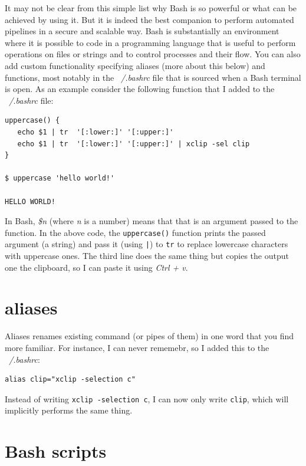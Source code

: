 \documentclass{book}
\begin{document}
It may not be clear from this simple list why Bash is so powerful or what can be achieved by using it. But it is indeed the best companion to perform automated pipelines in a secure and scalable way. Bash is substantially an environment where it is possible to code in a programming language that is useful to perform operations on files or strings and to control processes and their flow. You can also add custom functionality specifying aliases (more about this below) and functions, most notably in the \textit{~/.bashrc} file that is sourced when a Bash terminal is open. As an example consider the following function that I added to the \textit{~/.bashrc} file:

\begin{lstlisting}
uppercase() {
   echo $1 | tr  '[:lower:]' '[:upper:]'
   echo $1 | tr  '[:lower:]' '[:upper:]' | xclip -sel clip
}

$ uppercase 'hello world!'

HELLO WORLD!
\end{lstlisting}

In Bash, \textit{\$n} (where \textit{n} is a number) means that that is an argument passed to the function. In the above code, the \texttt{uppercase()} function prints the passed argument (a string) and pass it (using \texttt{|}) to \texttt{tr} to replace lowercase characters with uppercase ones. The third line does the same thing but copies the output one the clipboard, so I can paste it using \textit{Ctrl + v}.

\section{aliases}
Aliases renames existing command (or pipes of them) in one word that you find more familiar. For instance, I can never rememebr, so I added this to the \textit{~/.bashrc}:

\begin{lstlisting}
alias clip="xclip -selection c"
\end{lstlisting}

Instead of writing \lstinline[columns=fixed]{xclip -selection c}, I can now only write \lstinline[columns=fixed]{clip}, which will implicitly performs the same thing.\\

\section{Bash scripts}
\end{document}

